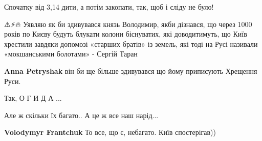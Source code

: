 \begin{itemize}
Спочатку від 3,14 дити, а потім закопати, так, щоб і сліду не було!

 

⚠️⚡️🔥 Уявляю як би здивувався князь Володимир, якби дізнався, що через 1000
років по Києву будуть блукати колони біснуватих, які доводитимуть, що Київ
хрестили завдяки допомозі «старших братів» із земель, які тоді на Русі називали
«мокшанськими болотами» - Сергій Таран

\begin{itemize}
 
\textbf{Anna Petryshak} він би ще більше здивувався що йому приписують Хрещення Руси.🤷
\end{itemize}

 
Так, О Г И Д А ...

 
Але ж скільки їх багато.. А це ж все наш нарід...

\begin{itemize}
 
\textbf{Volodymyr Frantchuk} То все, що є, небагато. Київ спостерігав))
\end{itemize}

 

\end{itemize}
